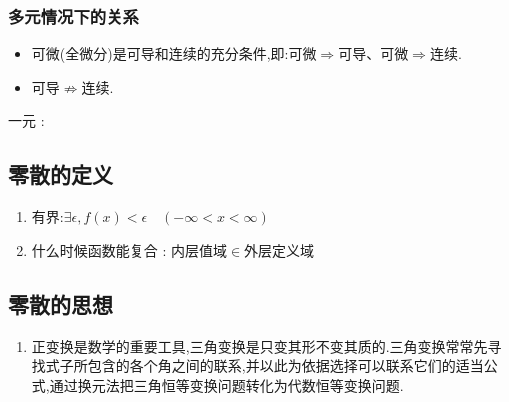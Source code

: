{{{        \begin{center}
        \end{center}
    }%

    \subsubsection{多元情况下的关系}{
        \begin{itemize}
            \item 可微(全微分)是可导和连续的充分条件,即:可微$\Rightarrow$可导、可微$\Rightarrow$连续.
            \item 可导$\nRightarrow$连续.
        \end{itemize}

        \begin{center}
            一元 :
        \end{center}
    }%

}%

\subsection{零散的定义}{
    \begin{enumerate}
        \item 有界:$\exists\epsilon,f(x) < \epsilon\quad(-\infty < x < \infty )$
        \item 什么时候函数能复合 : 内层值域$\in$外层定义域
    \end{enumerate}
}%

\subsection{零散的思想}{
    \begin{enumerate}
        \item 正变换是数学的重要工具,三角变换是只变其形不变其质的.三角变换常常先寻找式子所包含的各个角之间的联系,并以此为依据选择可以联系它们的适当公式,通过换元法把三角恒等变换问题转化为代数恒等变换问题.
    \end{enumerate}
}%

}%